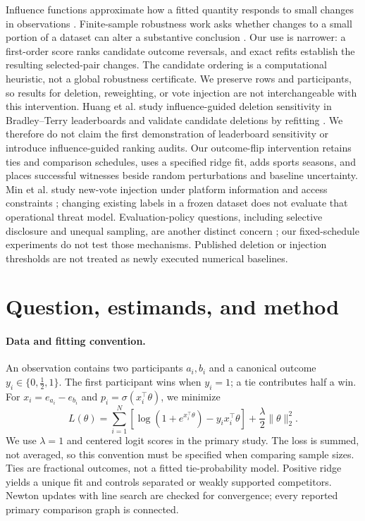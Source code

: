 Influence functions approximate how a fitted quantity responds to small changes in observations \citep{koh2017influence}. Finite-sample robustness work asks whether changes to a small portion of a dataset can alter a substantive conclusion \citep{broderick2020amip}. Our use is narrower: a first-order score ranks candidate outcome reversals, and exact refits establish the resulting selected-pair changes. The candidate ordering is a computational heuristic, not a global robustness certificate. We preserve rows and participants, so results for deletion, reweighting, or vote injection are not interchangeable with this intervention. Huang et al. study influence-guided deletion sensitivity in Bradley--Terry leaderboards and validate candidate deletions by refitting \citep{huang2025dropping}. We therefore do not claim the first demonstration of leaderboard sensitivity or introduce influence-guided ranking audits. Our outcome-flip intervention retains ties and comparison schedules, uses a specified ridge fit, adds sports seasons, and places successful witnesses beside random perturbations and baseline uncertainty. Min et al. study new-vote injection under platform information and access constraints \citep{min2025rigging}; changing existing labels in a frozen dataset does not evaluate that operational threat model. Evaluation-policy questions, including selective disclosure and unequal sampling, are another distinct concern \citep{singh2025illusion}; our fixed-schedule experiments do not test those mechanisms. Published deletion or injection thresholds are not treated as newly executed numerical baselines.

\section{Question, estimands, and method}
\label{sec:method}
\paragraph{Data and fitting convention.}
An observation contains two participants $a_i,b_i$ and a canonical outcome $y_i\in\{0,\tfrac12,1\}$. The first participant wins when $y_i=1$; a tie contributes half a win. For $x_i=e_{a_i}-e_{b_i}$ and $p_i=\sigma(x_i^\top\theta)$, we minimize
\begin{equation}
 L(\theta)=\sum_{i=1}^{N}\left[\log(1+e^{x_i^\top\theta})-y_i x_i^\top\theta\right]+\frac\lambda2\|\theta\|_2^2.
 \label{eq:bt}
\end{equation}
We use $\lambda=1$ and centered logit scores in the primary study. The loss is summed, not averaged, so this convention must be specified when comparing sample sizes. Ties are fractional outcomes, not a fitted tie-probability model. Positive ridge yields a unique fit and controls separated or weakly supported competitors. Newton updates with line search are checked for convergence; every reported primary comparison graph is connected.


